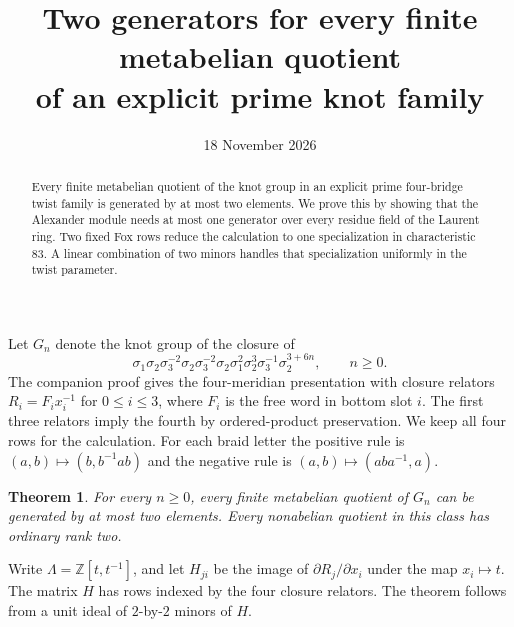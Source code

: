 \documentclass[11pt]{article}
\title{Two generators for every finite metabelian quotient\protect\\of an explicit prime knot family}
\author{}
\date{18 November 2026}
\newtheorem{theorem}{Theorem}
\newcommand{\Z}{\mathbb Z}
\begin{document}
\maketitle
\begin{abstract}
Every finite metabelian quotient of the knot group in an explicit
prime four-bridge twist family is generated by at most two elements.
We prove this by showing that the Alexander module needs at most one
generator over every residue field of the Laurent ring. Two fixed
Fox rows reduce the calculation to one specialization in characteristic
$83$. A linear combination of two minors handles that specialization
uniformly in the twist parameter.
\end{abstract}

Let $G_n$ denote the knot group of the closure of
\[
\sigma_1\sigma_2\sigma_3^{-2}\sigma_2\sigma_3^{-2}\sigma_2
\sigma_1^2\sigma_2^3\sigma_3^{-1}\sigma_2^{3+6n},\qquad n\ge0.
\]
The companion proof \cite[Lemma~1]{fox} gives the four-meridian
presentation with closure relators $R_i=F_ix_i^{-1}$ for $0\le i\le3$,
where $F_i$ is the free word in bottom slot $i$. The first three
relators imply the fourth by ordered-product preservation. We keep
all four rows for the calculation. For each braid letter the positive
rule is $(a,b)\mapsto(b,b^{-1}ab)$ and the negative rule is
$(a,b)\mapsto(aba^{-1},a)$.

\begin{theorem}\label{thm:metabelian}
For every $n\ge0$, every finite metabelian quotient of $G_n$ can be
generated by at most two elements. Every nonabelian quotient in this class
has ordinary rank two.
\end{theorem}

Write $\Lambda=\Z[t,t^{-1}]$, and let $H_{ji}$ be the image of
$\partial R_j/\partial x_i$ under the map $x_i\mapsto t$.
The matrix $H$ has rows indexed by the four closure relators.
The theorem follows from a unit ideal of $2$-by-$2$ minors of $H$.
\end{document}
